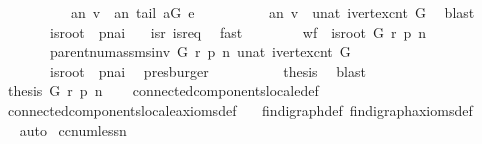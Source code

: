\begin{isabellebody}
\ \ \ \ \ \ \ \ \ \ \ {\isacharquery}an\ v\ {\isacharequal}\ {\isacharquery}an\ {\isacharparenleft}tail\ {\isacharquery}aG\ e{\isacharparenright}\ {\isacharplus}\ {}{\isacharparenright}\ {\isasymand}\ \isanewline
\ \ \ \ \ \ {\isacharquery}an\ v\ {\isacharless}\ unat\ {\isacharparenleft}ivertex{\isacharunderscore}cnt\ G{\isacharparenright}{\isachardoublequoteclose}\ \isamarkupfalse%
\ blast\isanewline
\ \ \ \isacommand{{\isacharbraceright}}\isamarkupfalse%
\ \isamarkupfalse%
\ \isamarkupfalse%
\ {\isachardoublequoteopen}{\isacharquery}is{\isacharunderscore}root\ {\isasymand}\ {\isacharquery}pnai{\isachardoublequoteclose}\ \isamarkupfalse%
\ \ isr\ isr{\isacharunderscore}eq\ \isamarkupfalse%
\ fast\isanewline
\ \ \isacommand{{\isacharbraceright}}\isamarkupfalse%
\ \isanewline
\ \ \isamarkupfalse%
\ {\isachardoublequoteopen}{\isacharquery}wf\ {\isasymand}\ is{\isacharunderscore}root\ G\ r\ p\ n\ {\isasymand}\ \isanewline
\ \ \ \ \ \ \ \ parent{\isacharunderscore}num{\isacharunderscore}assms{\isacharunderscore}inv\ G\ r\ p\ n\ {\isacharparenleft}unat\ {\isacharparenleft}ivertex{\isacharunderscore}cnt\ G{\isacharparenright}{\isacharparenright}\ {\isasymLongrightarrow}\isanewline
\ \ \ \ \ \ \ \ {\isacharquery}is{\isacharunderscore}root\ {\isasymand}\ {\isacharquery}pnai{\isachardoublequoteclose}\ \isamarkupfalse%
\ presburger\isanewline
\ \ \isamarkupfalse%
\ \isanewline
\ \ \ \ \isamarkupfalse%
\ {\isacharquery}thesis\ \isamarkupfalse%
\ blast\ \isanewline
\ \ \isamarkupfalse%
\isanewline
{}\isamarkupfalse%
\isanewline
{}\isamarkupfalse%
\ \ {\isachardoublequoteopen}{\isacharquery}thesis\ G\ r\ p\ n{\isachardoublequoteclose}\isanewline
\ \ \isamarkupfalse%
\ connected{\isacharunderscore}components{\isacharunderscore}locale{\isacharunderscore}def\ \isanewline
\ \ connected{\isacharunderscore}components{\isacharunderscore}locale{\isacharunderscore}axioms{\isacharunderscore}def\ \isanewline
\ \ fin{\isacharunderscore}digraph{\isacharunderscore}def\ fin{\isacharunderscore}digraph{\isacharunderscore}axioms{\isacharunderscore}def\ \isanewline
\ \ \isamarkupfalse%
\ auto\isanewline
{}\isamarkupfalse%
%
\endisatagproof
{\isafoldproof}%
%
\isadelimproof
\isanewline
%
\endisadelimproof
\isanewline
{}\isamarkupfalse%
\ cc{\isacharunderscore}num{\isacharunderscore}less{\isacharunderscore}n{\isacharcolon}\isanewline

\end{isabellebody}
